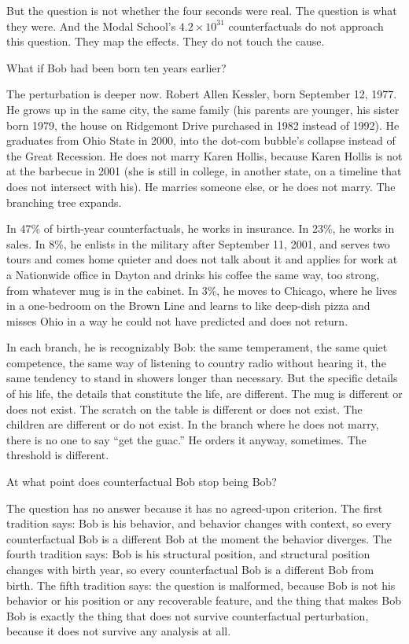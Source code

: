 But the question is not whether the four seconds were real. The question is what they were. And the Modal School's $4.2 \times 10^{31}$ counterfactuals do not approach this question. They map the effects. They do not touch the cause.

\bigskip

What if Bob had been born ten years earlier?

The perturbation is deeper now. Robert Allen Kessler, born September 12, 1977. He grows up in the same city, the same family (his parents are younger, his sister born 1979, the house on Ridgemont Drive purchased in 1982 instead of 1992). He graduates from Ohio State in 2000, into the dot-com bubble's collapse instead of the Great Recession. He does not marry Karen Hollis, because Karen Hollis is not at the barbecue in 2001 (she is still in college, in another state, on a timeline that does not intersect with his). He marries someone else, or he does not marry. The branching tree expands.

In 47\% of birth-year counterfactuals, he works in insurance. In 23\%, he works in sales. In 8\%, he enlists in the military after September 11, 2001, and serves two tours and comes home quieter and does not talk about it and applies for work at a Nationwide office in Dayton and drinks his coffee the same way, too strong, from whatever mug is in the cabinet. In 3\%, he moves to Chicago, where he lives in a one-bedroom on the Brown Line and learns to like deep-dish pizza and misses Ohio in a way he could not have predicted and does not return.

In each branch, he is recognizably Bob: the same temperament, the same quiet competence, the same way of listening to country radio without hearing it, the same tendency to stand in showers longer than necessary. But the specific details of his life, the details that constitute the life, are different. The mug is different or does not exist. The scratch on the table is different or does not exist. The children are different or do not exist. In the branch where he does not marry, there is no one to say ``get the guac.'' He orders it anyway, sometimes. The threshold is different.

At what point does counterfactual Bob stop being Bob?

The question has no answer because it has no agreed-upon criterion. The first tradition says: Bob is his behavior, and behavior changes with context, so every counterfactual Bob is a different Bob at the moment the behavior diverges. The fourth tradition says: Bob is his structural position, and structural position changes with birth year, so every counterfactual Bob is a different Bob from birth. The fifth tradition says: the question is malformed, because Bob is not his behavior or his position or any recoverable feature, and the thing that makes Bob Bob is exactly the thing that does not survive counterfactual perturbation, because it does not survive any analysis at all.

